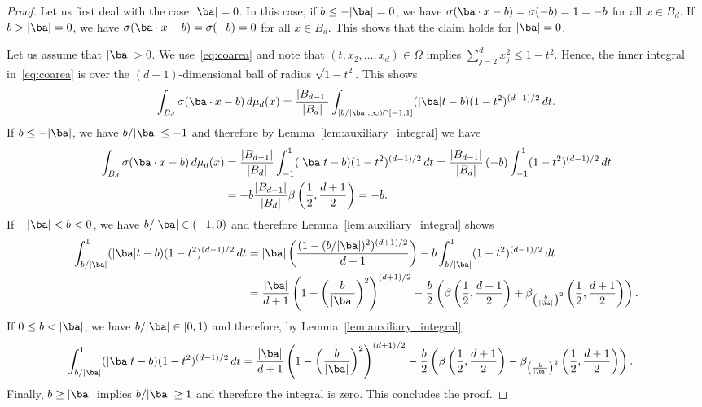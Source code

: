 \documentclass{amsart}[11pt]
\numberwithin{equation}{section}
\numberwithin{theorem}{section}
\begin{document}
\begin{proof}
    Let us first deal with the case $|\ba| = 0$. In this case, if $b \leq - |\ba| = 0$, we have $\sigma(\ba \cdot x - b) = \sigma(-b) = 1 = -b$ for all $x \in B_d$. If $b > |\ba| = 0$, we have $\sigma(\ba \cdot x - b) = \sigma(-b) = 0$ for all $x \in B_d$. This shows that the claim holds for $|\ba| = 0$.

    Let us assume that $|\ba| > 0$. We use~\eqref{eq:coarea} and note that $(t,x_2,\ldots,x_d)\in \Omega$ implies
    $\sum_{j = 2}^d x_j^2 \leq 1-t^2$. Hence, the inner integral in~\eqref{eq:coarea} is over the $(d-1)$-dimensional ball of radius $\sqrt{1 - t^2}$. This shows 
    \begin{align*}
        \int_{B_d} \sigma(\ba \cdot x - b) \, d\mu_d(x) = \frac{|B_{d-1}|}{|B_d|} \int_{[b/|\ba|, \infty) \cap [-1, 1]}  (|\ba|t - b)  (1 - t^2)^{(d-1)/2} \, dt.
    \end{align*}
    If $b \leq -|\ba|$, we have $b/|\ba| \leq -1$ and therefore by Lemma~\ref{lem:auxiliary_integral} we have
    \begin{align*}
        \int_{B_d} \sigma(\ba \cdot x - b) \, d\mu_d(x) &= \frac{|B_{d-1}|}{|B_d|} \int_{-1}^1 (|\ba|t - b)  (1 - t^2)^{(d-1)/2} \, dt = \frac{|B_{d-1}|}{|B_d|} \left(-b\right) \int_{-1}^1 (1 - t^2)^{(d-1)/2} \, dt \\
        &= -b \frac{|B_{d-1}|}{|B_d|} \beta\left(\frac{1}{2}, \frac{d + 1}{2}\right) = -b.
    \end{align*}
    If $-|\ba| < b < 0$, we have $b/|\ba| \in (-1, 0)$ and therefore Lemma~\ref{lem:auxiliary_integral} shows
    \begin{align*}
        \int_{b/|\ba|}^1 (|\ba|t - b)  (1 - t^2)^{(d-1)/2} \, dt 
                &= |\ba| \left(\frac{(1 - (b/|\ba|)^2)^{(d+1)/2}}{d + 1}\right) - b \int_{b/|\ba|}^1 (1 - t^2)^{(d-1)/2} \, dt \\
        &= \frac{|\ba|}{d + 1} \left(1 - \left(\frac{b}{|\ba|}\right)^2\right)^{(d+1)/2} - \frac{b}{2} \left( \beta\left(\frac{1}{2}, \frac{d+1}{2}\right) + \beta_{\left(\frac{b}{|\ba|}\right)^2}\left(\frac{1}{2}, \frac{d+1}{2}\right)\right).
    \end{align*}
    If $0 \leq b < |\ba|$, we have $b/|\ba| \in [0, 1)$ and therefore, by Lemma~\ref{lem:auxiliary_integral},
    \begin{align*}
        \int_{b/|\ba|}^1 (|\ba|t - b)  (1 - t^2)^{(d-1)/2} \, dt 
        &= \frac{|\ba|}{d + 1} \left(1 - \left(\frac{b}{|\ba|}\right)^2\right)^{(d+1)/2} - \frac{b}{2} \left( \beta\left(\frac{1}{2}, \frac{d+1}{2}\right) - \beta_{\left(\frac{b}{|\ba|}\right)^2}\left(\frac{1}{2}, \frac{d+1}{2}\right)\right).
    \end{align*}
    Finally, $b \geq |\ba|$ implies $b/|\ba| \geq 1$ and therefore the integral is zero. This concludes the proof.
\end{proof}
\end{document}
